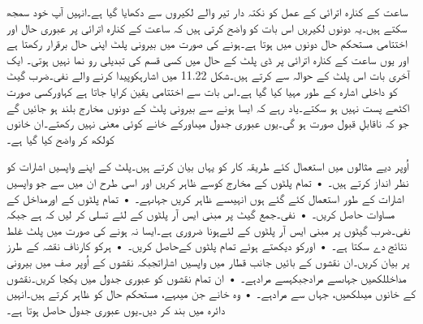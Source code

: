 	ساعت کے کنارہ اترائی کے عمل کو نکتہ دار تیر والے لکیروں سے دکھایا گیا ہے۔انہیں آپ خود سمجھ سکتے ہیں۔یہ دونوں لکیریں اس بات کو واضح کرتی ہیں کہ ساعت کے کنارہ اترائی پر عبوری حال اور اختتامی مستحکم حال دونوں میں ہوتا ہے۔ہونے کی صورت میں بیرونی پلٹ اپنی حال برقرار رکھتا ہے اور یوں ساعت کے کنارہ اترائی پر ڈی پلٹ کے حال میں کسی قسم کی تبدیلی رو نما نہیں ہوتی۔
	ایک آخری بات اس پلٹ کے حوالہ سے کرتے ہیں۔شکل 11.22 میں اشارہکوپیدا کرنے والے نفی۔ضرب گیٹ کو داخلی اشارہ کے طور مہیا کیا گیا ہے۔اس بات سے اختتامی یقین کرایا جاتا ہے کہاورکسی صورت اکٹھے پست نہیں ہو سکتے۔یاد رہے کہ ایسا ہونے سے بیرونی پلٹ کے دونوں مخارج بلند ہو جائیں گے جو کہ ناقابلِ قبول صورت ہو گی۔یوں عبوری جدول میںاورکے خانے کوئی معنی نہیں رکھتے۔ان خانوں کولکھ کر واضح کیا گیا ہے۔

	اُوپر دیے مثالوں میں استعمال کئے طریقہ کار کو یہاں بیان کرتے ہیں۔پلٹ کے اپنے واپسیں اشارات کو نظر انداز کرتے ہیں۔
    • تمام پلٹوں کے مخارج کوسے ظاہر کریں اور اسی طرح ان میں سے جو واپسیں اشارات کے طور استعمال کئے گئے ہوں انہیںسے ظاہر کریں جہاںہے۔
    • تمام پلٹوں کے اورمداخل کے مساوات حاصل کریں۔
    • نفی۔جمع گیٹ پر مبنی ایس آر پلٹوں کے لئے تسلی کر لیں کہ ہے جبکہ نفی۔ضرب گیٹوں پر مبنی ایس آر پلٹوں کے لئےہونا ضروری ہے۔ایسا نہ ہونے کی صورت میں پلٹ غلط نتائج دے سکتا ہے۔
    • اورکو دیکھتے ہوئے تمام پلٹوں کےحاصل کریں۔
    • ہرکو کارناف نقشہ کے طرز پر بیان کریں۔ان نقشوں کے بائیں جانب قطار میں واپسیں اشاراتجبکہ نقشوں کے اُوپر صف میں بیرونی مداخللکھیں جہاںسے مرادجبکہسے مرادہے۔
    • ان تمام نقشوں کو عبوری جدول میں یکجا کریں۔نقشوں کے خانوں میںلکھیں، جہاں سے مرادہے۔
    • وہ خانے جن میںہے، مستحکم حال کو ظاہر کرتے ہیں۔انہیں دائرہ میں بند کر دیں۔یوں عبوری جدول حاصل ہوتا ہے۔


